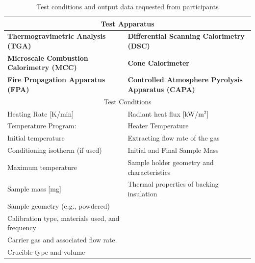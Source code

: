 \documentclass{book}
\begin{document}
\begin{table}[ht]
\caption{Test conditions and output data requested from participants}
\label{Table:Tests_Performed}
\begin{center}
\begin{tabular}{ll}
\hline
\multicolumn{2}{c}{Test Apparatus}                                                                       \\ \hline
 \textbf{Thermogravimetric Analysis (TGA)}         &  \textbf{Differential Scanning Calorimetry (DSC)}              \\
 \textbf{Microscale Combustion Calorimetry (MCC)} &  \textbf{Cone Calorimeter}                                     \\
 \textbf{Fire Propagation Apparatus (FPA)}                  &  \textbf{Controlled Atmosphere Pyrolysis Apparatus (CAPA)}     \\
\hline
\multicolumn{2}{c}{Test Conditions}                                                                      \\ \hline
Heating Rate [K/min]                              & Radiant heat flux [kW/m$^2$]                        \\
Temperature Program:                              & Heater Temperature                                   \\
\hspace{.1in} Initial temperature                 & Extracting flow rate of the gas                      \\
\hspace{.1in} Conditioning isotherm (if used)     & Initial and Final Sample Mass                        \\
\hspace{.1in} Maximum temperature                 & Sample holder geometry and characteristics           \\
Sample mass [mg]                                  & Thermal properties of backing insulation             \\
Sample geometry (e.g., powdered)                  &                                                      \\
Calibration type, materials used, and frequency   &                                                      \\
Carrier gas and associated flow rate              &                                                      \\
Crucible type and volume                          &                                                      \\

\end{tabular}
\end{center}
\end{table}
\end{document}
